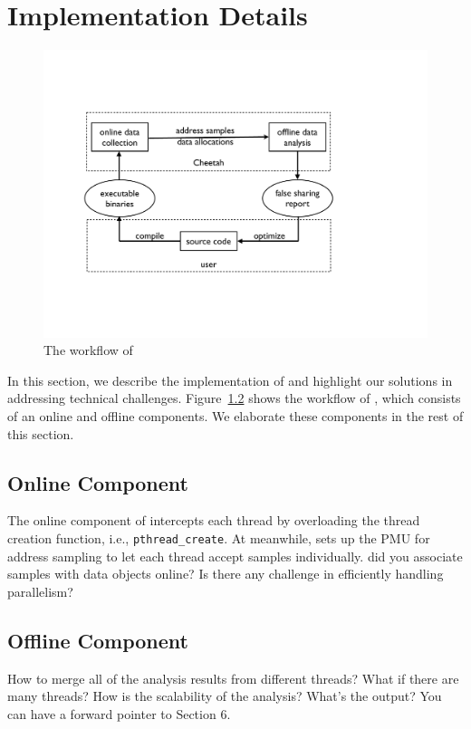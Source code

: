 \section{Implementation Details}
\label{sec:implement}

\begin{figure}[htbp]
\centering
\label{fig:fsinfs}
\includegraphics[width=\columnwidth]{figure/workflow}
\caption{The workflow of \cheetah{}}
\end{figure}

In this section, we describe the implementation of \cheetah{} and highlight our solutions in addressing technical challenges. Figure~\ref{} shows the workflow of \cheetah{}, 
which consists of an online and offline components. We elaborate these components in the rest of this section.

\subsection{Online Component}
The online component of \cheetah{} intercepts each thread by overloading the thread creation function, i.e., {\tt pthread\_create}. At meanwhile, \cheetah{} sets up the PMU for address sampling to let each thread accept samples individually. {\color{red} did you associate samples with data objects online? Is there any challenge in efficiently handling parallelism?}



\subsection{Offline Component}
{\color{red} How to merge all of the analysis results from different threads? What if there are many threads? How is the scalability of the analysis? What's the output? You can have a forward pointer to Section 6.}


